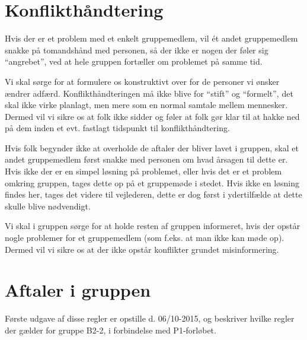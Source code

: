 \documentclass[hidelinks, 12pt]{article}
\newcommand{\group}{B2-2}
\begin{document}
	\section*{Konflikthåndtering}
	Hvis der er et problem med et enkelt gruppemedlem, vil \'et andet gruppemedlem snakke på tomandshånd med personen, så der ikke er nogen der føler sig ``angrebet'', ved at hele gruppen fortæller om problemet på samme tid. 

	Vi skal sørge for at formulere os konstruktivt over for de personer vi ønsker ændrer adfærd. Konflikthåndteringen må ikke blive for ``stift'' og ``formelt'', det skal ikke virke planlagt, men mere som en normal samtale mellem mennesker. Dermed vil vi sikre os at folk ikke sidder og føler at folk gør klar til at hakke ned på dem inden et evt. fastlagt tidspunkt til konflikthåndtering.

	Hvis folk begynder ikke at overholde de aftaler der bliver lavet i gruppen, skal et andet gruppemedlem først snakke med personen om hvad årsagen til dette er. Hvis ikke der er en simpel løsning på problemet, eller hvis det er et problem omkring gruppen, tages dette op på et gruppemøde i stedet. Hvis ikke en løsning findes her, tages det videre til vejlederen, dette er dog først i ydertilfælde at dette skulle blive nødvendigt.

	Vi skal i gruppen sørge for at holde resten af gruppen informeret, hvis der opstår nogle problemer for et gruppemedlem (som f.eks. at man ikke kan møde op). Dermed vil vi sikre os at der ikke opstår konflikter grundet misinformering.

	\section*{Aftaler i gruppen}
	Første udgave af disse regler er opstille d. 06/10-2015, og beskriver hvilke regler der gælder for gruppe \group, i forbindelse med P1-forløbet.
\end{document}
